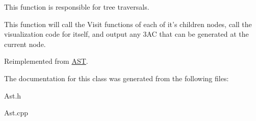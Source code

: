This function is responsible for tree traversals. 

This function will call the Visit functions of each of it's children nodes, call the visualization code for itself, and output any 3\-A\-C that can be generated at the current node. 

Reimplemented from \hyperlink{classAST_a5828cc86f2c4f1a0aeab6d7069e8fd82}{A\-S\-T}.



The documentation for this class was generated from the following files\-:\begin{DoxyCompactItemize}
\item 
Ast.\-h\item 
Ast.\-cpp\end{DoxyCompactItemize}
